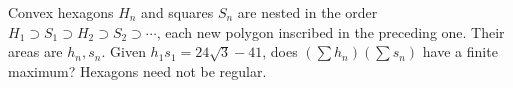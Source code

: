 Convex hexagons $H_n$ and squares $S_n$ are nested in the order $H_1\supset S_1\supset H_2\supset S_2\supset\cdots$, each new polygon inscribed in the preceding one. Their areas are $h_n,s_n$. Given $h_1s_1=24\sqrt3-41$, does $(\sum h_n)(\sum s_n)$ have a finite maximum? Hexagons need not be regular.
